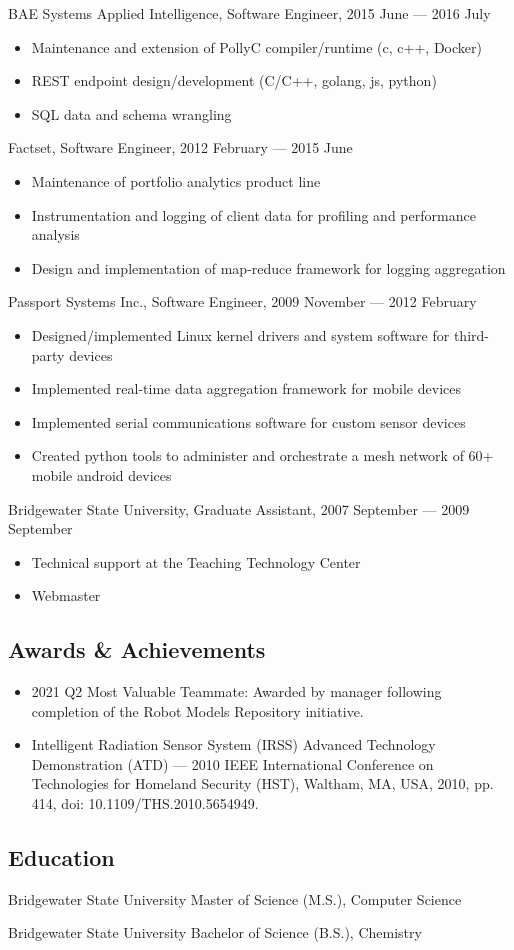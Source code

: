 \documentclass[letterpaper,11pt]{article}
\begin{document}
BAE Systems Applied Intelligence, Software Engineer, 2015 June --- 2016 July

\begin{itemize}
\item Maintenance and extension of PollyC compiler/runtime (c, c++, Docker)
\item REST endpoint design/development (C/C++, golang, js, python)
\item SQL data and schema wrangling
\end{itemize}

Factset, Software Engineer, 2012 February --- 2015 June

\begin{itemize}
\item Maintenance of portfolio analytics product line
\item Instrumentation and logging of client data for profiling and performance analysis
\item Design and implementation of map-reduce framework for logging aggregation
\end{itemize}

Passport Systems Inc., Software Engineer, 2009 November --- 2012 February

\begin{itemize}
\item Designed/implemented Linux kernel drivers and system software for
  third-party devices
\item Implemented real-time data aggregation framework for mobile devices
\item Implemented serial communications software for custom sensor devices
\item Created python tools to administer and orchestrate a mesh network of 60+
  mobile android devices
\end{itemize}

Bridgewater State University, Graduate Assistant, 2007 September --- 2009 September

\begin{itemize}
\item Technical support at the Teaching Technology Center
\item Webmaster
\end{itemize}

\subsection*{Awards \& Achievements}

\begin{itemize}
\item 2021 Q2 Most Valuable Teammate: Awarded by manager following completion
  of the Robot Models Repository initiative.
\item Intelligent Radiation Sensor System (IRSS) Advanced Technology
  Demonstration (ATD) --- 2010 IEEE International Conference on Technologies
  for Homeland Security (HST), Waltham, MA, USA, 2010, pp. 414, doi:
  10.1109/THS.2010.5654949.
\end{itemize}

\subsection*{Education}

Bridgewater State University
Master of Science (M.S.), Computer Science

Bridgewater State University
Bachelor of Science (B.S.), Chemistry
\end{document}
